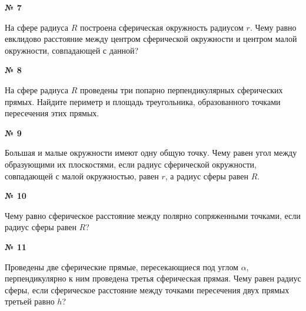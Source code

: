    \begin{center}
        \textbf{№ 7}
    \end{center}

    На сфере радиуса $R$ построена сферическая окружность радиусом $r$.
    Чему равно евклидово расстояние между центром сферической окружности и центром малой окружности,
    совпадающей с данной?


    \begin{center}
        \textbf{№ 8}
    \end{center}

    На сфере радиуса $R$ проведены три попарно перпендикулярных сферических прямых.
    Найдите периметр и площадь треугольника, образованного точками пересечения этих прямых.

    \begin{center}
        \textbf{№ 9}
    \end{center}

    Большая и малые окружности имеют одну общую точку.
    Чему равен угол между образующими их плоскостями, если радиус сферической окружности,
    совпадающей с малой окружностью, равен $r$, а радиус сферы равен $R$.

    \begin{center}
        \textbf{№ 10}
    \end{center}

    Чему равно сферическое расстояние между полярно сопряженными точками, если радиус сферы равен $R$?

    \begin{center}
        \textbf{№ 11}
    \end{center}

    Проведены две сферические прямые, пересекающиеся под углом $\alpha$,
    перпендикулярно к ним проведена третья сферическая прямая.
    Чему равен радиус сферы, если сферическое расстояние между точками пересечения
    двух прямых третьей равно $h$?



